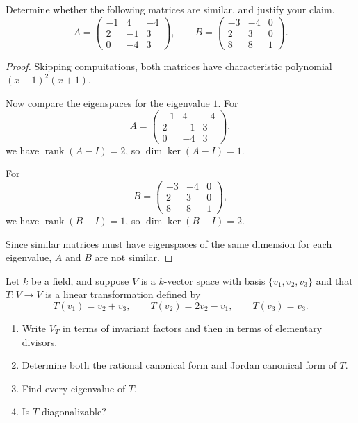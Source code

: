 \documentclass[addpoints,10pt]{exam}
\theoremstyle{plain}
\theoremstyle{definition}
\newtheorem{prob}[thm]{Problem}
\theoremstyle{plain}
\theoremstyle{plain}
\theoremstyle{definition}
\let\oldprob\prob
\let\endoldprob\endprob
\renewenvironment{prob}
  {\begin{singlespace}\oldprob}
  {\endoldprob\end{singlespace}}
\newcommand{\rank}{\ensuremath{\operatorname{rank}}}
\begin{document}

\newpage

\begin{prob}
Determine whether the following matrices are similar, and justify your claim.
\[
A=
\begin{pmatrix}
-1&4&-4\\
2&-1&3\\
0&-4&3
\end{pmatrix},
\qquad
B=
\begin{pmatrix}
-3&-4&0\\
2&3&0\\
8&8&1
\end{pmatrix}.
\]
\end{prob}

\begin{proof}
Skipping compuitations, both matrices have characteristic polynomial
$(x-1)^2(x+1)$.

Now compare the eigenspaces for the eigenvalue $1$. For
\[
A=
\begin{pmatrix}
-1&4&-4\\
2&-1&3\\
0&-4&3
\end{pmatrix},
\]
we have $\rank(A-I)=2$, so $\dim\ker(A-I)=1$.

For
\[
B=
\begin{pmatrix}
-3&-4&0\\
2&3&0\\
8&8&1
\end{pmatrix},
\]
we have $\rank(B-I)=1$, so $\dim\ker(B-I)=2$.

Since similar matrices must have eigenspaces of the same dimension for
each eigenvalue, $A$ and $B$ are not similar.

\end{proof}


\newpage

\begin{prob}
Let $k$ be a field, and suppose $V$ is a $k$-vector space with basis
$\{v_1,v_2,v_3\}$ and that $T:V\to V$ is a linear transformation defined by
\[
T(v_1)=v_2+v_3,\qquad
T(v_2)=2v_2-v_1,\qquad
T(v_3)=v_3.
\]

\begin{enumerate}[label=(\alph*)]
\item Write $V_T$ in terms of invariant factors and then in terms of elementary divisors.

\item Determine both the rational canonical form and Jordan canonical form of $T$.

\item Find every eigenvalue of $T$.

\item Is $T$ diagonalizable?
\end{enumerate}
\end{prob}
\end{document}
